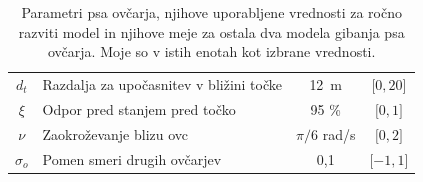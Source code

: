 \begin{table}[ht]
\begin{center}
\begin{tabular}{ c|l|c|c }
			$d_t$ & Razdalja za upočasnitev v bližini točke & 12~m & $\lbrack 0, 20 \rbrack$ \\
			$\xi$ & Odpor pred stanjem pred točko & 95 \% & $\lbrack 0, 1 \rbrack$ \\
			$\nu$ & Zaokroževanje blizu ovc & $\pi / 6$ rad/s & $\lbrack 0, 2 \rbrack$ \\
			$\sigma_o$ & Pomen smeri drugih ovčarjev & 0,1 & $\lbrack -1, 1 \rbrack$ \\
			\hline
		\end{tabular}
	\end{center}
	\caption[Parametri vodenja psa ovčarja]{Parametri psa ovčarja, njihove uporabljene vrednosti za ročno razviti model in njihove meje za ostala dva modela gibanja psa ovčarja. Moje so v istih enotah kot izbrane vrednosti.}
	\label{table:ovcar}
\end{table}
